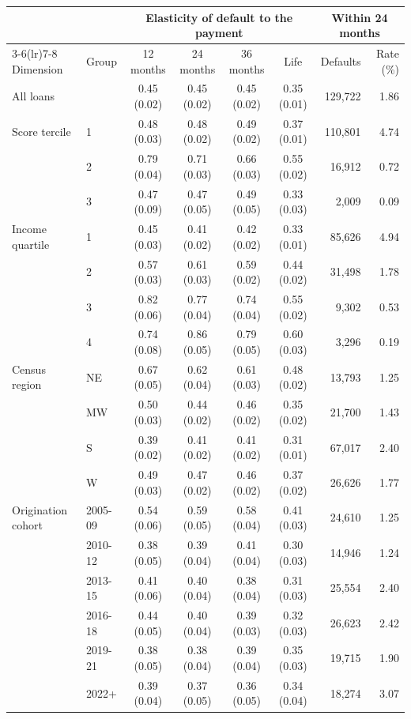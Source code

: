 \begin{tabular}{llcccc rr}
\toprule
 & & \multicolumn{4}{c}{Elasticity of default to the payment} & \multicolumn{2}{c}{Within 24 months} \\
\cmidrule(lr){3-6}\cmidrule(lr){7-8}
Dimension & Group & 12 months & 24 months & 36 months & Life & Defaults & Rate (\%) \\
\midrule
All loans &  & 0.45 (0.02) & 0.45 (0.02) & 0.45 (0.02) & 0.35 (0.01) & 129,722 & 1.86 \\
\addlinespace
Score tercile & 1 & 0.48 (0.03) & 0.48 (0.02) & 0.49 (0.02) & 0.37 (0.01) & 110,801 & 4.74 \\
 & 2 & 0.79 (0.04) & 0.71 (0.03) & 0.66 (0.03) & 0.55 (0.02) & 16,912 & 0.72 \\
 & 3 & 0.47 (0.09) & 0.47 (0.05) & 0.49 (0.05) & 0.33 (0.03) & 2,009 & 0.09 \\
\addlinespace
Income quartile & 1 & 0.45 (0.03) & 0.41 (0.02) & 0.42 (0.02) & 0.33 (0.01) & 85,626 & 4.94 \\
 & 2 & 0.57 (0.03) & 0.61 (0.03) & 0.59 (0.02) & 0.44 (0.02) & 31,498 & 1.78 \\
 & 3 & 0.82 (0.06) & 0.77 (0.04) & 0.74 (0.04) & 0.55 (0.02) & 9,302 & 0.53 \\
 & 4 & 0.74 (0.08) & 0.86 (0.05) & 0.79 (0.05) & 0.60 (0.03) & 3,296 & 0.19 \\
\addlinespace
Census region & NE & 0.67 (0.05) & 0.62 (0.04) & 0.61 (0.03) & 0.48 (0.02) & 13,793 & 1.25 \\
 & MW & 0.50 (0.03) & 0.44 (0.02) & 0.46 (0.02) & 0.35 (0.02) & 21,700 & 1.43 \\
 & S & 0.39 (0.02) & 0.41 (0.02) & 0.41 (0.02) & 0.31 (0.01) & 67,017 & 2.40 \\
 & W & 0.49 (0.03) & 0.47 (0.02) & 0.46 (0.02) & 0.37 (0.02) & 26,626 & 1.77 \\
\addlinespace
Origination cohort & 2005-09 & 0.54 (0.06) & 0.59 (0.05) & 0.58 (0.04) & 0.41 (0.03) & 24,610 & 1.25 \\
 & 2010-12 & 0.38 (0.05) & 0.39 (0.04) & 0.41 (0.04) & 0.30 (0.03) & 14,946 & 1.24 \\
 & 2013-15 & 0.41 (0.06) & 0.40 (0.04) & 0.38 (0.04) & 0.31 (0.03) & 25,554 & 2.40 \\
 & 2016-18 & 0.44 (0.05) & 0.40 (0.04) & 0.39 (0.03) & 0.32 (0.03) & 26,623 & 2.42 \\
 & 2019-21 & 0.38 (0.05) & 0.38 (0.04) & 0.39 (0.04) & 0.35 (0.03) & 19,715 & 1.90 \\
 & 2022+ & 0.39 (0.04) & 0.37 (0.05) & 0.36 (0.05) & 0.34 (0.04) & 18,274 & 3.07 \\
\bottomrule
\end{tabular}
